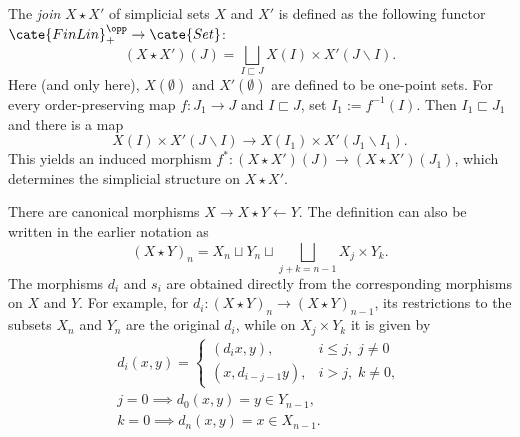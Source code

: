 \begin{definition}\label{def:simplicial-join}
	The \emph{join} $X\star X'$ of simplicial sets $X$ and $X'$ is defined as
	the following functor $\cate{FinLin}_+^{\opp}\to\cate{Set}$:
	\[ (X \star X')(J) = \bigsqcup_{I \sqsubset J} X(I) \times X'(J \smallsetminus I). \]
	Here (and only here), $X(\emptyset)$ and $X'(\emptyset)$ are defined to be
	one-point sets. For every order-preserving map $f:J_1\to J$ and
	$I\sqsubset J$, set $I_1:=f^{-1}(I)$. Then $I_1\sqsubset J_1$ and there
	is a map
	\[ X(I) \times X'(J \smallsetminus I) \to X(I_1) \times X'(J_1 \smallsetminus I_1). \]
	This yields an induced morphism
	$f^*:(X\star X')(J)\to(X\star X')(J_1)$, which determines the simplicial
	structure on $X\star X'$.
\end{definition}

There are canonical morphisms $X\to X\star Y\leftarrow Y$. The definition
can also be written in the earlier notation as
\[ (X \star Y)_n = X_n \sqcup Y_n \sqcup \bigsqcup_{j+k = n-1} X_j \times Y_k . \]
The morphisms $d_i$ and $s_i$ are obtained directly from the corresponding
morphisms on $X$ and $Y$. For example, for
$d_i:(X\star Y)_n\to(X\star Y)_{n-1}$, its restrictions to the subsets
$X_n$ and $Y_n$ are the original $d_i$, while on $X_j\times Y_k$ it is
given by
\begin{equation}\label{eqn:join-formulas}\begin{gathered}
		d_i(x, y) = \begin{cases}
			(d_i x, y), & i \leq j, \; j \neq 0 \\
			(x, d_{i-j-1} y), & i > j, \; k \neq 0,
		\end{cases} \\
		j=0 \implies d_0(x, y) = y \in Y_{n-1}, \\
		k=0 \implies d_n(x, y) = x \in X_{n-1}.
\end{gathered}\end{equation}

